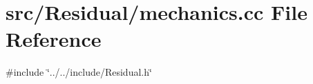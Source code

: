 \section{src/\+Residual/mechanics.cc File Reference}
\label{mechanics_8cc}
{\ttfamily \#include \char`\"{}../../include/\+Residual.\+h\char`\"{}}\newline
